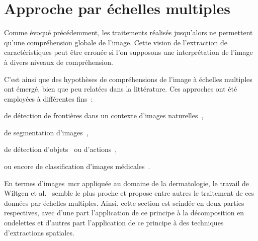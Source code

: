 \section{Approche par échelles multiples}
Comme évoqué précédemment, les traitements réalisés jusqu'alors ne permettent qu'une compréhension globale de l'image. Cette vision de l'extraction de caractéristiques peut être erronée si l'on supposons une interprétation de l'image à divers niveaux de compréhension.\par

C'est ainsi que des hypothèses de compréhensions de l'image à échelles multiples ont émergé, bien que peu relatées dans la littérature. Ces approches ont été employées à différentes fins~: 
\begin{inlinerate}
    \item de détection de frontières dans un contexte d'images naturelles~\cite{Ren2008},
    \item de segmentation d'images~\cite{Santos2012,Arbelaez2014},
    \item de détection d'objets~\cite{Felzenszwalb2008} ou d'actions~\cite{Pedersoli2011},
    \item ou encore de classification d'images médicales~\cite{Alsaih2016,Tang2017}.
\end{inlinerate} En termes d'images~\gls{mcr} appliquée au domaine de la dermatologie, le travail de Wiltgen et al.~\cite{Wiltgen2008} semble le plus proche et propose entre autres le traitement de ces données par échelles multiples. Ainsi, cette section est scindée en deux parties respectives, avec d'une part l'application de ce principe à la décomposition en ondelettes et d'autres part l'application de ce principe à des techniques d'extractions spatiales.\par 

